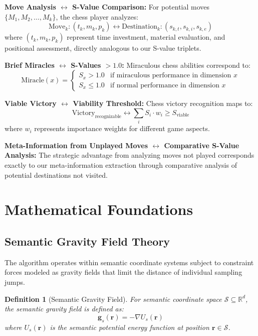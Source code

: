 \documentclass[12pt,a4paper]{article}
\newtheorem{definition}{Definition}
\begin{document}
\textbf{Move Analysis $\leftrightarrow$ S-Value Comparison:} For potential moves $\{M_1, M_2, \ldots, M_k\}$, the chess player analyzes:
\begin{equation}
\text{Move}_k: (t_k, m_k, p_k) \leftrightarrow \text{Destination}_k: (s_{k,t}, s_{k,i}, s_{k,e})
\end{equation}
where $(t_k, m_k, p_k)$ represent time investment, material evaluation, and positional assessment, directly analogous to our S-value triplets.

\textbf{Brief Miracles $\leftrightarrow$ S-Values $> 1.0$:} Miraculous chess abilities correspond to:
\begin{equation}
\text{Miracle}(x) = \begin{cases} 
S_x > 1.0 & \text{if miraculous performance in dimension } x \\
S_x \leq 1.0 & \text{if normal performance in dimension } x
\end{cases}
\end{equation}

\textbf{Viable Victory $\leftrightarrow$ Viability Threshold:} Chess victory recognition maps to:
\begin{equation}
\text{Victory}_{\text{recognizable}} \leftrightarrow \sum_{i} S_i \cdot w_i \geq S_{\text{viable}}
\end{equation}
where $w_i$ represents importance weights for different game aspects.

\textbf{Meta-Information from Unplayed Moves $\leftrightarrow$ Comparative S-Value Analysis:} The strategic advantage from analyzing moves not played corresponds exactly to our meta-information extraction through comparative analysis of potential destinations not visited.

\section{Mathematical Foundations}

\subsection{Semantic Gravity Field Theory}

The algorithm operates within semantic coordinate systems subject to constraint forces modeled as gravity fields that limit the distance of individual sampling jumps.

\begin{definition}[Semantic Gravity Field]
For semantic coordinate space $\mathcal{S} \subseteq \mathbb{R}^d$, the semantic gravity field is defined as:
\begin{equation}
\mathbf{g}_s(\mathbf{r}) = -\nabla U_s(\mathbf{r})
\end{equation}
where $U_s(\mathbf{r})$ is the semantic potential energy function at position $\mathbf{r} \in \mathcal{S}$.
\end{definition}
\end{document}

